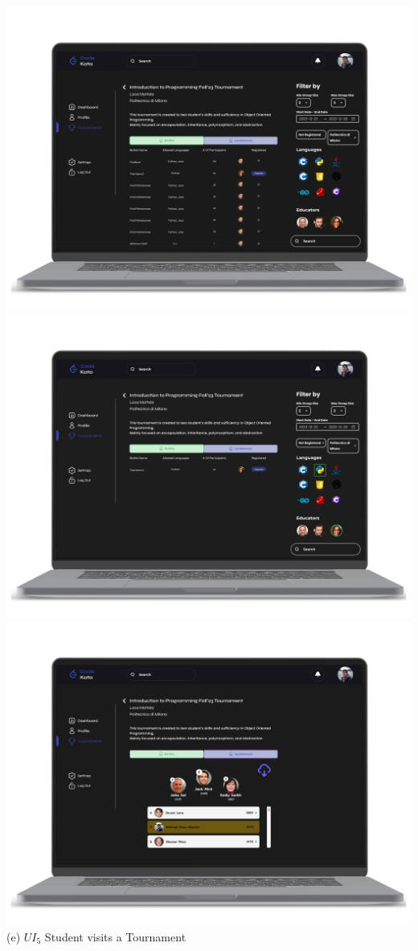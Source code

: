 \begin{center}
    \includegraphics[scale=0.13]{Images/ui-ux/student_tournament_1.png}
    \includegraphics[scale=0.13]{Images/ui-ux/student_tournament_2.png}    \includegraphics[scale=0.13]{Images/ui-ux/student_tournament_3.png} 
    \\ (e) $UI_{5}$ Student visits a Tournament 
\end{center}
